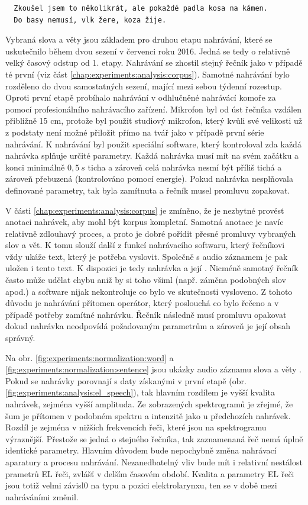 \begin{verbatim}
  Zkoušel jsem to několikrát, ale pokaždé padla kosa na kámen.
  Do basy nemusí, vlk žere, koza žije.
\end{verbatim}

Vybraná slova a věty jsou základem pro druhou etapu nahrávání, které se uskutečnilo během dvou sezení v červenci roku 2016. Jedná se tedy o relativně velký časový odstup od 1. etapy. Nahrávání se zhostil stejný řečník jako v případě té první (viz část \ref{chap:experiments:analysis:corpus}). Samotné nahrávání bylo rozděleno do dvou samostatných sezení, mající mezi sebou týdenní rozestup. Oproti první etapě probíhalo nahrávání v odhlučněné nahrávácí komoře za pomocí profesionálního nahrávacího zařízení. Mikrofon byl od úst řečníka vzdálen přibližně 15 cm, protože byl použit studiový mikrofon, který kvůli své velikosti už z podstaty není možné přiložit přímo na tvář jako v případě první série nahrávání. K nahrávání byl použit speciální software, který kontroloval zda každá nahrávka splňuje určité parametry. Každá nahrávka musí mít na svém začátku a konci minimálně $0,5\ s$ ticha a zároveň celá nahrávka nesmí být příliš tichá a zároveň přebuzená (kontrolováno pomocí energie). Pokud nahrávka nesplňovala definované parametry, tak byla zamítnuta a řečník musel promluvu zopakovat.

V části \ref{chap:experiments:analysis:corpus} je zmíněno, že je nezbytné provést anotaci nahrávek, aby mohl být korpus kompletní. Samotná anotace je navíc relativně zdlouhavý proces, a proto je dobré pořídit přesné promluvy vybraných slov a vět. K tomu slouží další z funkcí nahrávacího softwaru, který řečníkovi vždy ukáže text, který je potřeba vyslovit. Společně s audio záznamem je pak uložen i tento text. K dispozici je tedy nahrávka a její . Nicméně samotný řečník často může udělat chybu aniž by si toho všiml (např. záměna podobných slov apod.) a software nijak nekontroluje co bylo ve skutečnosti vysloveno. Z tohoto důvodu je nahrávání přítomen operátor, který poslouchá co bylo řečeno a v případě potřeby zamítné nahrávku. Řečník následně musí promluvu opakovat dokud nahrávka neodpovídá požadovaným parametrům a zároveň je její obsah správný.

Na obr. \ref{fig:experiments:normalization:word} a \ref{fig:experiments:normalization:sentence} jsou ukázky audio záznamu slova  a věty . Pokud se nahrávky porovnají s daty získanými v první etapě (obr. \ref{fig:experiments:analysis:el_speech}), tak hlavním rozdílem je vyšší kvalita nahrávek, zejména vyšší amplituda. Ze zobrazených spektrogramů je zřejmé, že šum je přítomen v podobném spektru a intenzitě jako u předchozích nahrávek. Rozdíl je zejména v nižších frekvencích řeči, které jsou na spektrogramu výraznější. Přestože se jedná o stejného řečníka, tak zaznamenaná řeč nemá úplně identické parametry. Hlavním důvodem bude nepochybně změna nahrávací aparatury a procesu nahrávání. Nezanedbatelný vliv bude mít i relativní nestálost prametrů EL řeči, zvlášť v delším časovém období. Kvalita a parametry EL řeči jsou totiž velmi závisl0 na typu a pozici elektrolarynxu, ten se v době mezi nahráváními změnil.

